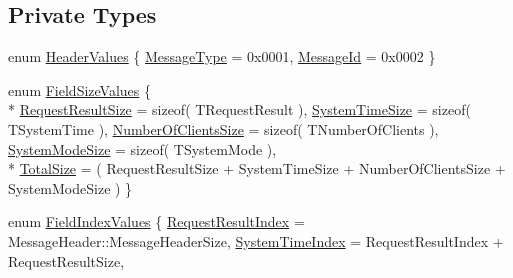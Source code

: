 \subsection*{Private Types}
\begin{DoxyCompactItemize}
\item 
enum \hyperlink{class_terra_swarm_1_1_asynchronous_1_1_client_connection_response_a210030e9835d5daaae100ff496cc2b99}{Header\-Values} \{ \hyperlink{class_terra_swarm_1_1_asynchronous_1_1_client_connection_response_a210030e9835d5daaae100ff496cc2b99a1b0238ecfc24737ee8aa6565198b4052}{Message\-Type} = 0x0001, 
\hyperlink{class_terra_swarm_1_1_asynchronous_1_1_client_connection_response_a210030e9835d5daaae100ff496cc2b99ad712a2b73f3d9eff7aafa56e30b11bad}{Message\-Id} = 0x0002
 \}
\item 
enum \hyperlink{class_terra_swarm_1_1_asynchronous_1_1_client_connection_response_a059519ab548bdfbe546b4583c5174fe1}{Field\-Size\-Values} \{ \\*
\hyperlink{class_terra_swarm_1_1_asynchronous_1_1_client_connection_response_a059519ab548bdfbe546b4583c5174fe1ad21e0ac9ec91fa55bf9ba9f4881872cf}{Request\-Result\-Size} = sizeof( T\-Request\-Result ), 
\hyperlink{class_terra_swarm_1_1_asynchronous_1_1_client_connection_response_a059519ab548bdfbe546b4583c5174fe1aebe21ab3228fd3367b5372237080e6af}{System\-Time\-Size} = sizeof( T\-System\-Time ), 
\hyperlink{class_terra_swarm_1_1_asynchronous_1_1_client_connection_response_a059519ab548bdfbe546b4583c5174fe1a2723f340b52e7a61e4ed178a70f167df}{Number\-Of\-Clients\-Size} = sizeof( T\-Number\-Of\-Clients ), 
\hyperlink{class_terra_swarm_1_1_asynchronous_1_1_client_connection_response_a059519ab548bdfbe546b4583c5174fe1a837dd622de291c559f0cdd336d8c4644}{System\-Mode\-Size} = sizeof( T\-System\-Mode ), 
\\*
\hyperlink{class_terra_swarm_1_1_asynchronous_1_1_client_connection_response_a059519ab548bdfbe546b4583c5174fe1a8e2d828f094f9ecb69a26c1eed16a103}{Total\-Size} = ( Request\-Result\-Size + System\-Time\-Size + Number\-Of\-Clients\-Size + System\-Mode\-Size )
 \}
\item 
enum \hyperlink{class_terra_swarm_1_1_asynchronous_1_1_client_connection_response_a696e860584893543721be9624b7114fc}{Field\-Index\-Values} \{ \hyperlink{class_terra_swarm_1_1_asynchronous_1_1_client_connection_response_a696e860584893543721be9624b7114fca29bcb52c78bd4915167362f6f59ce536}{Request\-Result\-Index} = Message\-Header\-:\-:Message\-Header\-Size, 
\hyperlink{class_terra_swarm_1_1_asynchronous_1_1_client_connection_response_a696e860584893543721be9624b7114fca24610af2c75e9f00dd1a1bb759c1bcb8}{System\-Time\-Index} = Request\-Result\-Index + Request\-Result\-Size, 

\end{DoxyCompactItemize}

